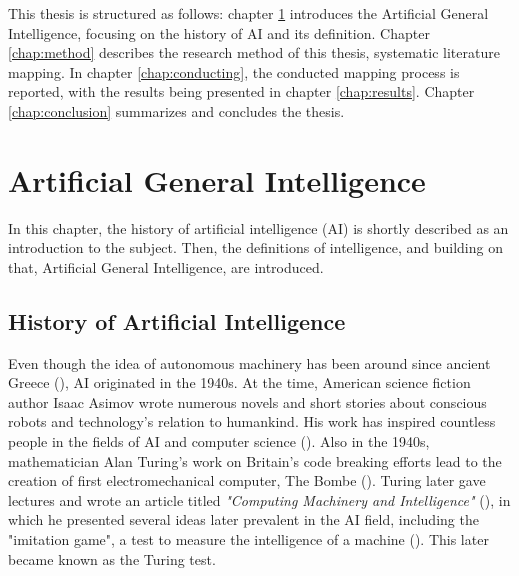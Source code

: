This thesis is structured as follows: chapter \ref{chap:agi} introduces the
Artificial General Intelligence, focusing on the history of AI and its
definition. Chapter \ref*{chap:method} describes the research method of this
thesis, systematic literature mapping. In chapter \ref*{chap:conducting}, the
conducted mapping process is reported, with the results being presented in
chapter \ref*{chap:results}. Chapter \ref{chap:conclusion} summarizes and
concludes the thesis.

\chapter{Artificial General Intelligence}
\label{chap:agi}

In this chapter, the history of artificial intelligence (AI) is shortly
described as an introduction to the subject. Then, the definitions of
intelligence, and building on that, Artificial General Intelligence, are
introduced.

\section{History of Artificial Intelligence}
\label{history}

Even though the idea of autonomous machinery has been around since ancient
Greece (\cite{bramer2009artificial}), AI originated in the 1940s. At the time,
American science fiction author Isaac Asimov wrote numerous novels and short
stories about conscious robots and technology's relation to humankind. His work
has inspired countless people in the fields of AI and computer science
(\cite{kaplan2019}). Also in the 1940s, mathematician Alan Turing's work on
Britain's code breaking efforts lead to the creation of first electromechanical
computer, The Bombe (\cite{kaplan2019}). Turing later gave lectures and wrote an
article titled \emph{"Computing Machinery and Intelligence"}
(\cite*{turing1950}), in which he presented several ideas later prevalent in the
AI field, including the "imitation game", a test to measure the intelligence of
a machine (\cite{norvig2002}). This later became known as the Turing test.

